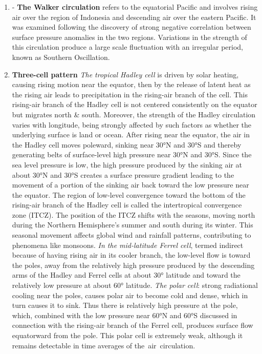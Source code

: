 \begin{enumerate}
	\item - \textbf{The Walker circulation} refers to the equatorial Pacific and involves rising air over the region of Indonesia and descending air over the eastern Pacific. It was examined following the discovery of strong negative correlation between surface pressure anomalies in the two regions.
	      Variations in the strength of this circulation produce a large scale fluctuation with an irregular period, known as Southern Oscillation.

	\item \textbf{Three-cell pattern}
	      \newline \textit{The tropical Hadley cell} is driven by solar heating, causing rising motion near the equator, then by the release of latent heat as the rising air leads to precipitation in the rising-air branch of the cell. This rising-air branch of the Hadley cell is not centered consistently on the equator but migrates north \& south.
	      Moreover, the strength of the Hadley circulation varies with longitude, being strongly affected by such factors as whether the underlying surface is land or ocean. After rising near the equator, the air in the Hadley cell moves poleward, sinking near 30°N and 30°S and thereby generating belts of surface-level high pressure near 30°N and 30°S. Since the sea level pressure is low, the high pressure produced by the sinking air at about 30°N and 30°S creates a surface pressure gradient leading to the movement of a portion of the sinking air back toward the low pressure near the equator. The region of low-level convergence toward the bottom of the rising-air branch of the Hadley cell is called the intertropical convergence zone (ITCZ). The position of the ITCZ shifts with the seasons, moving north during the Northern Hemisphere’s summer and south during its winter. This seasonal movement affects global wind and rainfall patterns, contributing to phenomena like monsoons.
	      \newline\textit{In the mid-latitude Ferrel cell}, termed indirect because of having rising air in its cooler branch, the low-level flow is toward the poles, away from the relatively high pressure produced by the descending arms of the Hadley and Ferrel cells at about 30° latitude and toward the relatively low pressure at about 60° latitude.
	      \newline \textit{The polar cell}: strong radiational cooling near the poles, causes polar air to become cold and dense, which in turn causes it to sink. Thus there is relatively high pressure at the pole, which, combined with the low pressure near 60°N and 60°S discussed in connection with the rising-air branch of the Ferrel cell, produces surface flow equatorward from the pole. This polar cell is extremely weak, although it remains detectable in time averages of the air circulation.

\end{enumerate}

